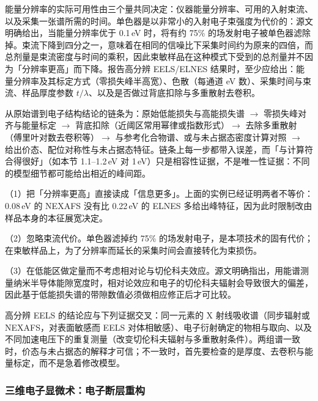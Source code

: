 \begin{measure}
能量分辨率的实际可用性由三个量共同决定：仪器能量分辨率、可用的入射束流、以及采集一张谱所需的时间。单色器是以非常小的入射电子束强度为代价的：源文明确给出，当能量分辨率优于 0.1\,eV 时，将有约 75\% 的场发射电子被单色器滤除掉。束流下降到四分之一，意味着在相同的信噪比下采集时间约为原来的四倍，而总剂量是束流密度与时间的乘积，因此束敏样品在这种模式下受到的总剂量并不因为「分辨率更高」而下降。报告高分辨 EELS/ELNES 结果时，至少应给出：能量分辨率及其标定方式（零损失峰半高宽）、色散（每通道 eV 数）、采集时间与束流、样品厚度参数 $t/\lambda$、以及是否做过背底扣除与多重散射去卷积。
\end{measure}

\begin{dataflow}
从原始谱到电子结构结论的链条为：原始低能损失与高能损失谱 $\to$ 零损失峰对齐与能量标定 $\to$ 背底扣除（近阈区常用幂律或指数形式）$\to$ 去除多重散射（傅里叶对数去卷积等）$\to$ 与参考化合物谱、或与未占据态密度计算对照 $\to$ 给出价态、配位对称性与未占据态特征。链条上每一步都带入误差，而「与计算符合得很好」（如本节 1.1--1.2\,eV 对 1\,eV）只是相容性证据，不是唯一性证据：不同的模型细节都可能给出相近的峰间距。
\end{dataflow}

\begin{pitfall}
（1）把「分辨率更高」直接读成「信息更多」。上面的实例已经证明两者不等价：0.08\,eV 的 NEXAFS 没有比 0.22\,eV 的 ELNES 多给出峰特征，因为此时限制改由样品本身的本征展宽决定。

（2）忽略束流代价。单色器滤掉约 75\% 的场发射电子，是本项技术的固有代价；在束敏样品上，为了分辨率而延长的采集时间会直接转化为束损伤。

（3）在低能区做定量而不考虑相对论与切伦科夫效应。源文明确指出，用能谱测量纳米半导体能隙宽度时，相对论效应和电子的切伦科夫辐射会导致很大的偏差，因此基于低能损失谱的带隙数值必须做相应修正后才可比较。
\end{pitfall}

\begin{crosscheck}
高分辨 EELS 的结论应与下列证据交叉：同一元素的 X 射线吸收谱（同步辐射或 NEXAFS，对表面敏感而 EELS 对体相敏感）、电子衍射确定的物相与取向、以及不同加速电压下的重复测量（改变切伦科夫辐射与多重散射条件）。两组谱一致时，价态与未占据态的解释才可信；不一致时，首先要检查的是厚度、去卷积与能量标定，而不是急着修改模型。
\end{crosscheck}

\subsubsection{三维电子显微术：电子断层重构}

